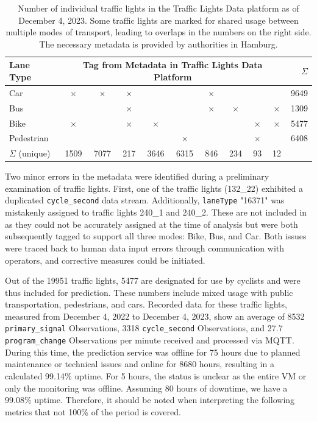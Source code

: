 \begin{table}[t]
    \centering
    \begin{tabular}{@{}lcccccccccr@{}}
        \toprule
        \textbf{Lane Type} & \multicolumn{9}{c}{\textbf{Tag from Metadata in Traffic Lights Data Platform}} & \textbf{$\Sigma$} \\
        \midrule
        Car        & $\times$ & $\times$ & $\times$ &   &   & $\times$ &   &   &   &  9649 \\
        Bus        &   &   & $\times$ &   &   & $\times$ & $\times$ &   & $\times$ &  1309 \\
        Bike     & $\times$ &   & $\times$ & $\times$ &   &   &   & $\times$ & $\times$ &  5477 \\
        Pedestrian &   &   &   &   & $\times$ &   &   & $\times$ &   &  6408 \\
        \midrule
        $\Sigma$ (unique) & 1509 & 7077 & 217 & 3646 & 6315 & 846 & 234 & 93 & 12 & \\
        \bottomrule
    \end{tabular}
    \caption{Number of individual traffic lights in the Traffic Lights Data platform as of December 4, 2023. Some traffic lights are marked for shared usage between multiple modes of transport, leading to overlaps in the numbers on the right side. The necessary metadata is provided by authorities in Hamburg.}
    \label{tab:tld-number-of-things}
\end{table}

Two minor errors in the metadata were identified during a preliminary examination of traffic lights. First, one of the traffic lights (132\_22) exhibited a duplicated \texttt{cycle\_second} data stream. Additionally, \texttt{laneType} "16371" was mistakenly assigned to traffic lights 240\_1 and 240\_2. These are not included in  as they could not be accurately assigned at the time of analysis but were both subsequently tagged to support all three modes: Bike, Bus, and Car. Both issues were traced back to human data input errors through communication with operators, and corrective measures could be initiated.

Out of the 19951 traffic lights, 5477 are designated for use by cyclists and were thus included for prediction. These numbers include mixed usage with public transportation, pedestrians, and cars. Recorded data for these traffic lights, measured from December 4, 2022 to December 4, 2023, show an average of 8532 \texttt{primary\_signal} Observations, 3318 \texttt{cycle\_second} Observations, and 27.7 \texttt{program\_change} Observations per minute received and processed via MQTT. During this time, the prediction service was offline for 75 hours due to planned maintenance or technical issues and online for 8680 hours, resulting in a calculated 99.14\% uptime. For 5 hours, the status is unclear as the entire VM or only the monitoring was offline. Assuming 80 hours of downtime, we have a 99.08\% uptime. Therefore, it should be noted when interpreting the following metrics that not 100\% of the period is covered.

